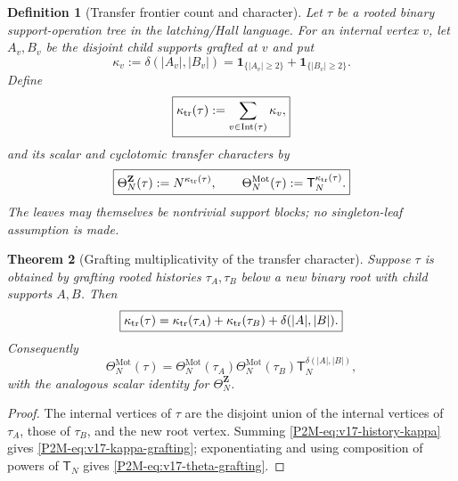 \documentclass[11pt]{article}
\newtheorem{theorem}{Theorem}[section]
\newtheorem{definition}[theorem]{Definition}
\theoremstyle{remark}
\newcommand{\Z}{\mathbf Z}
\newcommand{\Mot}{\mathrm{Mot}}
\begin{document}
\begin{definition}[Transfer frontier count and character]
\label{P2M-def:v17-transfer-history-character}
Let $\tau$ be a rooted binary support-operation tree in the latching/Hall language.  For an internal vertex
$v$, let $A_v,B_v$ be the disjoint child supports grafted at $v$ and put
\[
 \kappa_v:=\delta(|A_v|,|B_v|)
 =\mathbf 1_{\{|A_v|\ge2\}}
  +\mathbf 1_{\{|B_v|\ge2\}}.
\]
Define
\begin{equation}\label{P2M-eq:v17-history-kappa}
 \boxed{
 \kappa_{\rm tr}(\tau):=
 \sum_{v\in\operatorname{Int}(\tau)}\kappa_v,}
\end{equation}
and its scalar and cyclotomic transfer characters by
\begin{equation}\label{P2M-eq:v17-history-transfer-character}
 \boxed{
 \Theta_N^{\Z}(\tau):=N^{\kappa_{\rm tr}(\tau)},
 \qquad
 \Theta_N^{\Mot}(\tau):=
 \mathsf T_N^{\kappa_{\rm tr}(\tau)}.}
\end{equation}
The leaves may themselves be nontrivial support blocks; no singleton-leaf
assumption is made.
\end{definition}

\begin{theorem}[Grafting multiplicativity of the transfer character]
\label{P2M-thm:v17-history-character-multiplicative}
Suppose $\tau$ is obtained by grafting rooted histories $\tau_A,\tau_B$ below
a new binary root with child supports $A,B$.  Then
\begin{equation}\label{P2M-eq:v17-kappa-grafting}
 \boxed{
 \kappa_{\rm tr}(\tau)
 =\kappa_{\rm tr}(\tau_A)
  +\kappa_{\rm tr}(\tau_B)
  +\delta(|A|,|B|).}
\end{equation}
Consequently
\begin{equation}\label{P2M-eq:v17-theta-grafting}
 \boxed{
 \Theta_N^{\Mot}(\tau)
 =\Theta_N^{\Mot}(\tau_A)
  \Theta_N^{\Mot}(\tau_B)
  \mathsf T_N^{\delta(|A|,|B|)},}
\end{equation}
with the analogous scalar identity for $\Theta_N^{\Z}$.
\end{theorem}

\begin{proof}
The internal vertices of $\tau$ are the disjoint union of the internal
vertices of $\tau_A$, those of $\tau_B$, and the new root vertex.  Summing
\eqref{P2M-eq:v17-history-kappa} gives \eqref{P2M-eq:v17-kappa-grafting}; exponentiating
and using composition of powers of $\mathsf T_N$ gives
\eqref{P2M-eq:v17-theta-grafting}.
\end{proof}
\end{document}
